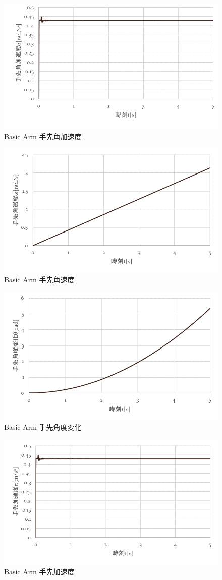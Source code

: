 \documentclass[10pt,b5paper,papersize,dvipdfmx]{jsbook}
\begin{document}
\begin{figure}[H]
  \centering
  \includegraphics[width=.7\textwidth]{img/robot06.png}
  \caption{Basic Arm 手先角加速度}
  \label{Basic Arm 手先角加速度}
\end{figure}
\begin{figure}[htbp]
  \centering
  \includegraphics[width=.7\textwidth]{img/robot07.png}
  \caption{Basic Arm 手先角速度}
  \label{fig:Basic Arm 手先角速度}
\end{figure}
\begin{figure}[htbp]
  \centering
  \includegraphics[width=.7\textwidth]{img/robot08.png}
  \caption{Basic Arm 手先角度変化}
  \label{fig:Basic Arm 手先角度変化2}
\end{figure}
\begin{figure}[htbp]
  \centering
  \includegraphics[width=.7\textwidth]{img/robot09.png}
  \caption{Basic Arm 手先加速度}
  \label{fig:Basic Arm 手先加速度}
\end{figure}
\end{document}
